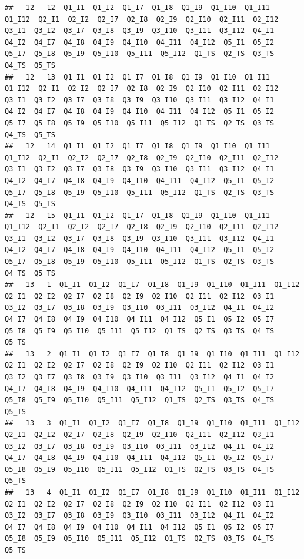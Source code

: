 \documentclass[
]{book}
\begin{document}
\begin{verbatim}
##   12   12  Q1_I1  Q1_I2  Q1_I7  Q1_I8  Q1_I9  Q1_I10  Q1_I11  Q1_I12  Q2_I1  Q2_I2  Q2_I7  Q2_I8  Q2_I9  Q2_I10  Q2_I11  Q2_I12  Q3_I1  Q3_I2  Q3_I7  Q3_I8  Q3_I9  Q3_I10  Q3_I11  Q3_I12  Q4_I1  Q4_I2  Q4_I7  Q4_I8  Q4_I9  Q4_I10  Q4_I11  Q4_I12  Q5_I1  Q5_I2  Q5_I7  Q5_I8  Q5_I9  Q5_I10  Q5_I11  Q5_I12  Q1_TS  Q2_TS  Q3_TS  Q4_TS  Q5_TS
##   12   13  Q1_I1  Q1_I2  Q1_I7  Q1_I8  Q1_I9  Q1_I10  Q1_I11  Q1_I12  Q2_I1  Q2_I2  Q2_I7  Q2_I8  Q2_I9  Q2_I10  Q2_I11  Q2_I12  Q3_I1  Q3_I2  Q3_I7  Q3_I8  Q3_I9  Q3_I10  Q3_I11  Q3_I12  Q4_I1  Q4_I2  Q4_I7  Q4_I8  Q4_I9  Q4_I10  Q4_I11  Q4_I12  Q5_I1  Q5_I2  Q5_I7  Q5_I8  Q5_I9  Q5_I10  Q5_I11  Q5_I12  Q1_TS  Q2_TS  Q3_TS  Q4_TS  Q5_TS
##   12   14  Q1_I1  Q1_I2  Q1_I7  Q1_I8  Q1_I9  Q1_I10  Q1_I11  Q1_I12  Q2_I1  Q2_I2  Q2_I7  Q2_I8  Q2_I9  Q2_I10  Q2_I11  Q2_I12  Q3_I1  Q3_I2  Q3_I7  Q3_I8  Q3_I9  Q3_I10  Q3_I11  Q3_I12  Q4_I1  Q4_I2  Q4_I7  Q4_I8  Q4_I9  Q4_I10  Q4_I11  Q4_I12  Q5_I1  Q5_I2  Q5_I7  Q5_I8  Q5_I9  Q5_I10  Q5_I11  Q5_I12  Q1_TS  Q2_TS  Q3_TS  Q4_TS  Q5_TS
##   12   15  Q1_I1  Q1_I2  Q1_I7  Q1_I8  Q1_I9  Q1_I10  Q1_I11  Q1_I12  Q2_I1  Q2_I2  Q2_I7  Q2_I8  Q2_I9  Q2_I10  Q2_I11  Q2_I12  Q3_I1  Q3_I2  Q3_I7  Q3_I8  Q3_I9  Q3_I10  Q3_I11  Q3_I12  Q4_I1  Q4_I2  Q4_I7  Q4_I8  Q4_I9  Q4_I10  Q4_I11  Q4_I12  Q5_I1  Q5_I2  Q5_I7  Q5_I8  Q5_I9  Q5_I10  Q5_I11  Q5_I12  Q1_TS  Q2_TS  Q3_TS  Q4_TS  Q5_TS
##   13   1  Q1_I1  Q1_I2  Q1_I7  Q1_I8  Q1_I9  Q1_I10  Q1_I11  Q1_I12  Q2_I1  Q2_I2  Q2_I7  Q2_I8  Q2_I9  Q2_I10  Q2_I11  Q2_I12  Q3_I1  Q3_I2  Q3_I7  Q3_I8  Q3_I9  Q3_I10  Q3_I11  Q3_I12  Q4_I1  Q4_I2  Q4_I7  Q4_I8  Q4_I9  Q4_I10  Q4_I11  Q4_I12  Q5_I1  Q5_I2  Q5_I7  Q5_I8  Q5_I9  Q5_I10  Q5_I11  Q5_I12  Q1_TS  Q2_TS  Q3_TS  Q4_TS  Q5_TS
##   13   2  Q1_I1  Q1_I2  Q1_I7  Q1_I8  Q1_I9  Q1_I10  Q1_I11  Q1_I12  Q2_I1  Q2_I2  Q2_I7  Q2_I8  Q2_I9  Q2_I10  Q2_I11  Q2_I12  Q3_I1  Q3_I2  Q3_I7  Q3_I8  Q3_I9  Q3_I10  Q3_I11  Q3_I12  Q4_I1  Q4_I2  Q4_I7  Q4_I8  Q4_I9  Q4_I10  Q4_I11  Q4_I12  Q5_I1  Q5_I2  Q5_I7  Q5_I8  Q5_I9  Q5_I10  Q5_I11  Q5_I12  Q1_TS  Q2_TS  Q3_TS  Q4_TS  Q5_TS
##   13   3  Q1_I1  Q1_I2  Q1_I7  Q1_I8  Q1_I9  Q1_I10  Q1_I11  Q1_I12  Q2_I1  Q2_I2  Q2_I7  Q2_I8  Q2_I9  Q2_I10  Q2_I11  Q2_I12  Q3_I1  Q3_I2  Q3_I7  Q3_I8  Q3_I9  Q3_I10  Q3_I11  Q3_I12  Q4_I1  Q4_I2  Q4_I7  Q4_I8  Q4_I9  Q4_I10  Q4_I11  Q4_I12  Q5_I1  Q5_I2  Q5_I7  Q5_I8  Q5_I9  Q5_I10  Q5_I11  Q5_I12  Q1_TS  Q2_TS  Q3_TS  Q4_TS  Q5_TS
##   13   4  Q1_I1  Q1_I2  Q1_I7  Q1_I8  Q1_I9  Q1_I10  Q1_I11  Q1_I12  Q2_I1  Q2_I2  Q2_I7  Q2_I8  Q2_I9  Q2_I10  Q2_I11  Q2_I12  Q3_I1  Q3_I2  Q3_I7  Q3_I8  Q3_I9  Q3_I10  Q3_I11  Q3_I12  Q4_I1  Q4_I2  Q4_I7  Q4_I8  Q4_I9  Q4_I10  Q4_I11  Q4_I12  Q5_I1  Q5_I2  Q5_I7  Q5_I8  Q5_I9  Q5_I10  Q5_I11  Q5_I12  Q1_TS  Q2_TS  Q3_TS  Q4_TS  Q5_TS

\end{verbatim}
\end{document}
